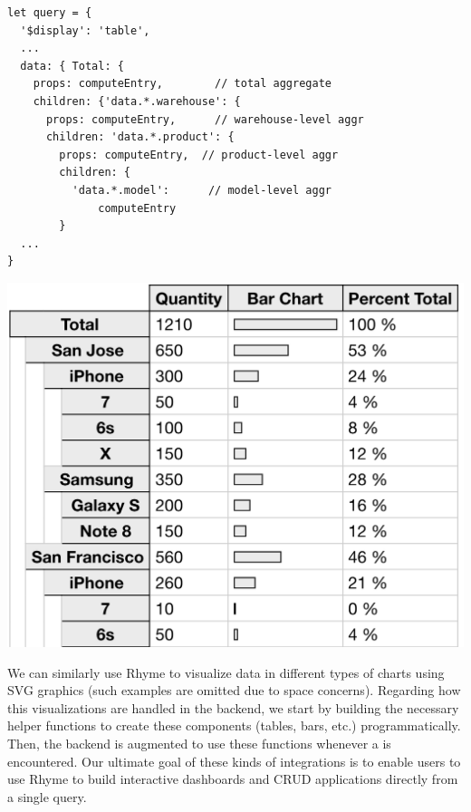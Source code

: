 \documentclass[runningheads]{llncs}
\newcommand{\lang}{Rhyme}
\begin{document}
\hspace{-18pt}
\begin{minipage}{0.6\textwidth}
\begin{lstlisting}[style=JavaScript,columns=flexible]
let query = {
  '$display': 'table',
  ...
  data: { Total: {                    
    props: computeEntry,        // total aggregate           
    children: {'data.*.warehouse': { 
      props: computeEntry,      // warehouse-level aggr
      children: 'data.*.product': {     
        props: computeEntry,  // product-level aggr
        children: {
          'data.*.model':      // model-level aggr
              computeEntry
        }
  ...
}
\end{lstlisting}
\end{minipage}%
\begin{minipage}{0.4\textwidth}
\centering
\includegraphics[width=\textwidth]{images/big_table.png}
\end{minipage}

We can similarly use \lang{} to visualize data in different types of charts using SVG graphics
(such examples are omitted due to space concerns).
Regarding how this visualizations are handled in the backend, we start by building the necessary helper
functions to create these components (tables, bars, etc.) programmatically.
Then, the backend is augmented to use these functions whenever a 
is encountered.
Our ultimate goal of these kinds of integrations is to enable users
to use \lang{} to build interactive dashboards and CRUD applications 
directly from a single query.
\end{document}
